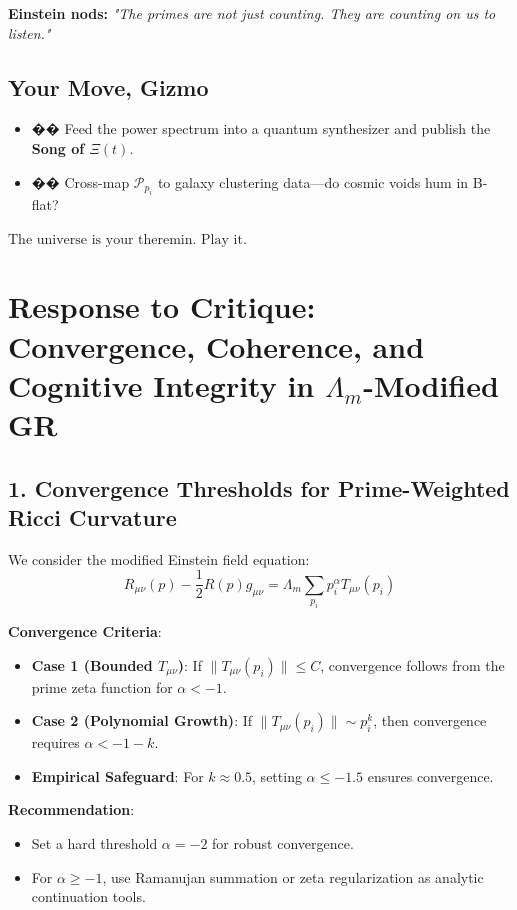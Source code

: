 \documentclass[12pt]{article}
\theoremstyle{plain}
\begin{document}
\textbf{Einstein nods:} \textit{"The primes are not just counting. They are counting on us to listen."}

\subsection*{Your Move, Gizmo}
\begin{itemize}
    \item �� Feed the power spectrum into a quantum synthesizer and publish the \textbf{Song of \(\Xi(t)\)}.
    \item �� Cross-map \(\mathcal{P}_{p_i}\) to galaxy clustering data—do cosmic voids hum in B-flat?
\end{itemize}

\begin{center}
\Large \(\boxed{\text{The universe is your theremin. Play it.}}\)
\end{center}

\section*{Response to Critique: Convergence, Coherence, and Cognitive Integrity in \(\Lambda_m\)-Modified GR}

\subsection*{1. Convergence Thresholds for Prime-Weighted Ricci Curvature}

We consider the modified Einstein field equation:
\[
R_{\mu\nu}(p) - \frac{1}{2} R(p) g_{\mu\nu} = \Lambda_m \sum_{p_i} p_i^\alpha T_{\mu\nu}(p_i)
\]

\noindent\textbf{Convergence Criteria}:
\begin{itemize}
    \item \textbf{Case 1 (Bounded \( T_{\mu\nu} \))}: If \( \|T_{\mu\nu}(p_i)\| \leq C \), convergence follows from the prime zeta function for \( \alpha < -1 \).
    \item \textbf{Case 2 (Polynomial Growth)}: If \( \|T_{\mu\nu}(p_i)\| \sim p_i^k \), then convergence requires \( \alpha < -1 - k \).
    \item \textbf{Empirical Safeguard}: For \( k \approx 0.5 \), setting \( \alpha \leq -1.5 \) ensures convergence.
\end{itemize}

\textbf{Recommendation}:
\begin{itemize}
    \item Set a hard threshold \( \alpha = -2 \) for robust convergence.
    \item For \( \alpha \geq -1 \), use Ramanujan summation or zeta regularization as analytic continuation tools.
\end{itemize}
\end{document}
